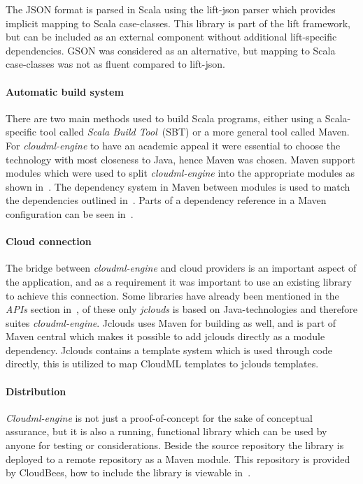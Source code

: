 The JSON format is parsed in Scala using the lift-json parser which provides implicit
mapping to Scala case-classes. This library is part of the lift framework,
but can be included as an external component without additional lift-specific dependencies.
GSON was considered as an alternative, but mapping to Scala case-classes was not as 
fluent compared to lift-json.

\paragraph{Automatic build system}
There are two main methods used to build Scala programs, either using a Scala-specific tool called 
\emph{Scala Build Tool}~(SBT) or a more general tool called Maven. 
For \emph{cloudml-engine} to have an academic appeal it were essential to choose the technology
with most closeness to Java, hence Maven was chosen.
Maven support modules which were used to split \emph{cloudml-engine} into the appropriate 
modules as shown in~. 
The dependency system in Maven between modules is used to match the dependencies outlined in~.
Parts of a dependency reference in a Maven configuration can be seen in~.

\paragraph{Cloud connection}
The bridge between \emph{cloudml-engine} and cloud providers is an important aspect of the application, and as a requirement
it was important to use an existing library to achieve this connection.
Some libraries have already been mentioned in the \emph{APIs} section in~,
of these only \emph{jclouds} is based on Java-technologies and therefore suites \emph{cloudml-engine}.
Jclouds uses Maven for building as well, and is part of Maven central which makes 
it possible to add jclouds directly as a module dependency.
Jclouds contains a template system which is used through code directly, this is utilized 
to map CloudML templates to jclouds templates.

\paragraph{Distribution}
\emph{Cloudml-engine} is not just a proof-of-concept for the sake of conceptual assurance, but it is 
also a running, functional library which can be used by anyone for testing or considerations.
Beside the source repository\cite{cloudml-engine} the library is deployed to a remote repository
\cite{cloudbees-cloudml-engine} as a Maven module.
This repository is provided by CloudBees, 
how to include the library is viewable in~.

